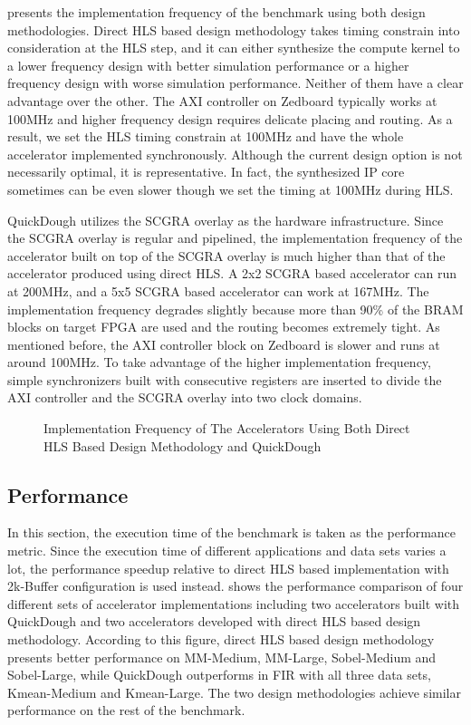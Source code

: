  presents the implementation frequency of the benchmark using both design methodologies. Direct HLS based design methodology takes timing constrain into consideration at the HLS step, and it can either synthesize the compute kernel to a lower frequency design with better simulation performance or a higher frequency design with worse simulation performance. Neither of them have a clear advantage over the other. The AXI controller on Zedboard typically works at 100MHz and higher frequency design requires delicate placing and routing. As a result, we set the HLS timing constrain at 100MHz and have the whole accelerator implemented synchronously. Although the current design option is not necessarily optimal, it is representative. In fact, the synthesized IP core sometimes can be even slower though we set the timing at 100MHz during HLS.

QuickDough utilizes the SCGRA overlay as the hardware infrastructure. Since the SCGRA overlay is regular and pipelined, the implementation frequency of the accelerator built on top of the SCGRA overlay is much higher than that of the accelerator produced using direct HLS. A 2x2 SCGRA based accelerator can run at 200MHz, and a 5x5 SCGRA based accelerator can work at 167MHz. The implementation frequency degrades slightly because more than 90\% of the BRAM blocks on target FPGA are used and the routing becomes extremely tight. As mentioned before, the AXI controller block on Zedboard is slower and runs at around 100MHz. To take advantage of the higher implementation frequency, simple synchronizers built with consecutive registers are inserted to divide the AXI controller and the SCGRA overlay into two clock domains.

\begin{figure}[htpb]
\caption{Implementation Frequency of The Accelerators Using Both Direct HLS Based Design Methodology and QuickDough}
\label{fig:impl-freq}
\end{figure}

\subsection{Performance}
In this section, the execution time of the benchmark is taken as the performance metric. Since the execution time of different applications and data sets varies a lot, the performance speedup relative to direct HLS based implementation with 2k-Buffer configuration is used instead.  shows the performance comparison of four different sets of accelerator implementations including two accelerators built with QuickDough and two accelerators developed with direct HLS based design methodology. According to this figure, direct HLS based design methodology presents better performance on MM-Medium, MM-Large, Sobel-Medium and Sobel-Large, while QuickDough outperforms in FIR with all three data sets, Kmean-Medium and Kmean-Large. The two design methodologies achieve similar performance on the rest of the benchmark. 

